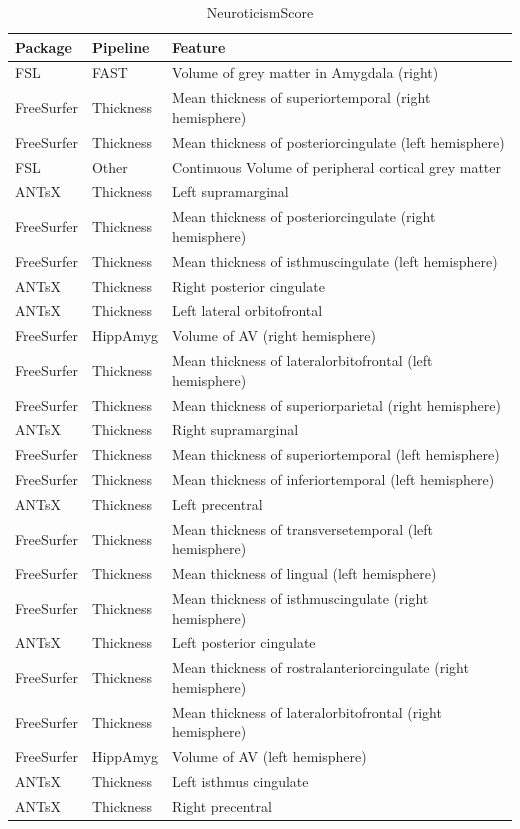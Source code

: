 \documentclass[
  10pt,
]{article}
\begin{document}
\begin{table}

\caption{\label{tab:compare-predictions}NeuroticismScore}
\centering
\begin{tabular}[t]{lll}
\toprule
Package & Pipeline & Feature\\
\midrule
FSL & FAST & Volume of grey matter in Amygdala (right)\\
FreeSurfer & Thickness & Mean thickness of superiortemporal (right hemisphere)\\
FreeSurfer & Thickness & Mean thickness of posteriorcingulate (left hemisphere)\\
FSL & Other & Continuous    Volume of peripheral cortical grey matter\\
ANTsX & Thickness & Left supramarginal\\
\addlinespace
FreeSurfer & Thickness & Mean thickness of posteriorcingulate (right hemisphere)\\
FreeSurfer & Thickness & Mean thickness of isthmuscingulate (left hemisphere)\\
ANTsX & Thickness & Right posterior cingulate\\
ANTsX & Thickness & Left lateral orbitofrontal\\
FreeSurfer & HippAmyg & Volume of AV (right hemisphere)\\
\addlinespace
FreeSurfer & Thickness & Mean thickness of lateralorbitofrontal (left hemisphere)\\
FreeSurfer & Thickness & Mean thickness of superiorparietal (right hemisphere)\\
ANTsX & Thickness & Right supramarginal\\
FreeSurfer & Thickness & Mean thickness of superiortemporal (left hemisphere)\\
FreeSurfer & Thickness & Mean thickness of inferiortemporal (left hemisphere)\\
\addlinespace
ANTsX & Thickness & Left precentral\\
FreeSurfer & Thickness & Mean thickness of transversetemporal (left hemisphere)\\
FreeSurfer & Thickness & Mean thickness of lingual (left hemisphere)\\
FreeSurfer & Thickness & Mean thickness of isthmuscingulate (right hemisphere)\\
ANTsX & Thickness & Left posterior cingulate\\
\addlinespace
FreeSurfer & Thickness & Mean thickness of rostralanteriorcingulate (right hemisphere)\\
FreeSurfer & Thickness & Mean thickness of lateralorbitofrontal (right hemisphere)\\
FreeSurfer & HippAmyg & Volume of AV (left hemisphere)\\
ANTsX & Thickness & Left isthmus cingulate\\
ANTsX & Thickness & Right precentral\\
\bottomrule
\end{tabular}
\end{table}
\end{document}
